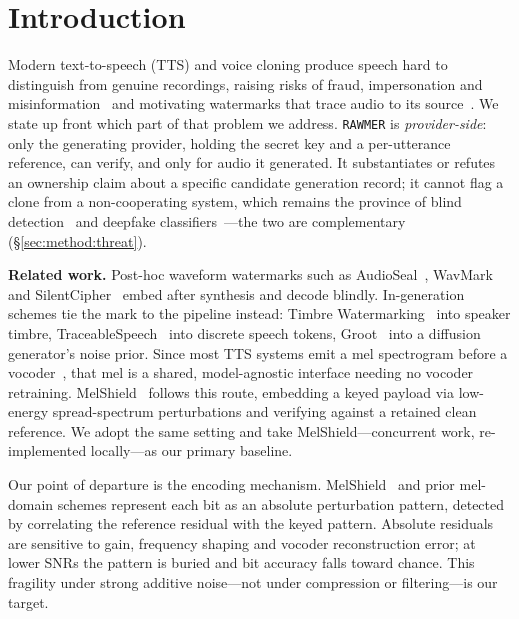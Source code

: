 \section{Introduction}
\label{sec:introduction}
Modern text-to-speech (TTS) and voice cloning produce speech hard to distinguish
from genuine recordings, raising risks of fraud, impersonation and
misinformation~\cite{yi2023} and motivating watermarks that trace audio to its
source~\cite{san2024,chen2023}. We state up front which part of that problem we
address. \texttt{RAWMER} is \emph{provider-side}: only the generating provider,
holding the secret key and a per-utterance reference, can verify, and only for audio
it generated. It substantiates or refutes an ownership claim about a specific
candidate generation record; it cannot flag a clone from a non-cooperating system,
which remains the province of blind detection~\cite{san2024} and deepfake
classifiers~\cite{yi2023}---the two are complementary
(\S\ref{sec:method:threat}).

\textbf{Related work.} Post-hoc waveform watermarks such as
AudioSeal~\cite{san2024}, WavMark~\cite{chen2023} and SilentCipher~\cite{singh2024}
embed after synthesis and decode blindly. In-generation schemes tie the mark to the pipeline instead: Timbre
Watermarking~\cite{liu2024timbre} into speaker timbre,
Trace\-able\-Speech~\cite{zhou2024} into discrete speech tokens,
Groot~\cite{liu2024groot} into a diffusion generator's noise prior. Since most TTS
systems emit a mel spectrogram before a vocoder~\cite{kong2020,kong2021}, that mel is
a shared, model-agnostic interface needing no vocoder retraining.
MelShield~\cite{jin2026} follows this route, embedding a keyed payload via low-energy
spread-spectrum perturbations and verifying against a retained clean reference. We
adopt the same setting and take MelShield---concurrent work, re-implemented
locally---as our primary baseline.

Our point of departure is the encoding mechanism. MelShield~\cite{jin2026} and prior
mel-domain schemes represent each bit as an absolute perturbation pattern, detected by
correlating the reference residual with the keyed pattern. Absolute residuals are
sensitive to gain, frequency shaping and vocoder reconstruction error; at lower SNRs
the pattern is buried and bit accuracy falls toward chance. This fragility under
strong additive noise---not under compression or filtering---is our target.

